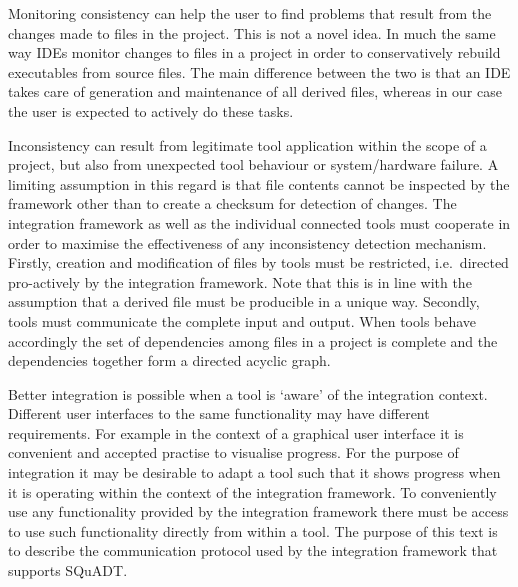 \documentclass{article}
\newcommand{\squadt}{SQuADT\xspace}
\begin{document}
  Monitoring consistency can help the user to find problems that result from
  the changes made to files in the project. This is not a novel idea. In much
  the same way IDEs monitor changes to files in a project in order to
  conservatively rebuild executables from source files. The main difference
  between the two is that an IDE takes care of generation and maintenance of
  all derived files, whereas in our case the user is expected to actively do
  these tasks.

  Inconsistency can result from legitimate tool application within the scope of
  a project, but also from unexpected tool behaviour or system/hardware
  failure. A limiting assumption in this regard is that file contents cannot be
  inspected by the framework other than to create a checksum for detection of
  changes.  The integration framework as well as the individual connected tools
  must cooperate in order to maximise the effectiveness of any inconsistency
  detection mechanism.  Firstly, creation and modification of files by tools
  must be restricted, i.e.\ directed pro-actively by the integration framework.
  Note that this is in line with the assumption that a derived file must be
  producible in a unique way. Secondly, tools must communicate the complete
  input and output.  When tools behave accordingly the set of dependencies
  among files in a project is complete and the dependencies together form a
  directed acyclic graph.
 
  Better integration is possible when a tool is `aware' of the integration
  context.  Different user interfaces to the same functionality may have
  different requirements. For example in the context of a graphical user
  interface it is convenient and accepted practise to visualise progress. For
  the purpose of integration it may be desirable to adapt a tool such that it
  shows progress when it is operating within the context of the integration
  framework. To conveniently use any functionality provided by the integration
  framework there must be access to use such functionality directly from within
  a tool.  The purpose of this text is to describe the communication protocol
  used by the integration framework that supports \squadt.

\end{document}
